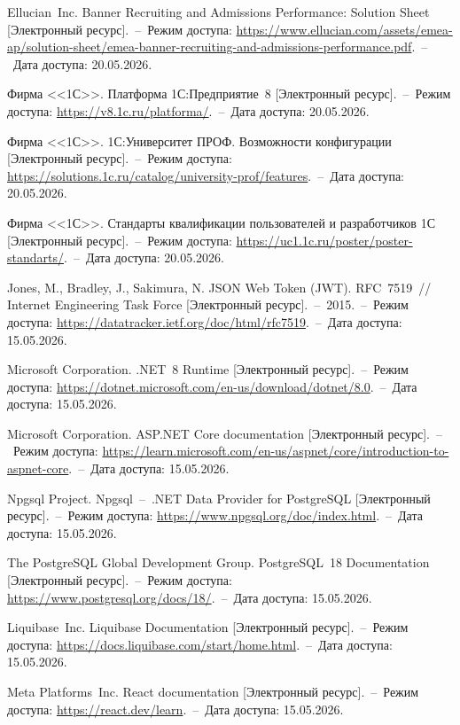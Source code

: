 \begin{enumerate}[label=\arabic*, wide=0pt, labelsep=1ex, nosep]
 Ellucian~Inc. Banner Recruiting and Admissions Performance: Solution Sheet [Электронный ресурс].~--~Режим доступа: \url{https://www.ellucian.com/assets/emea-ap/solution-sheet/emea-banner-recruiting-and-admissions-performance.pdf}.~--~Дата доступа: 20.05.2026.

\src[1c-platform] Фирма <<1С>>. Платформа 1С:Предприятие~8 [Электронный ресурс].~--~Режим доступа: \url{https://v8.1c.ru/platforma/}.~--~Дата доступа: 20.05.2026.

 Фирма <<1С>>. 1С:Университет ПРОФ. Возможности конфигурации [Электронный ресурс].~--~Режим доступа: \url{https://solutions.1c.ru/catalog/university-prof/features}.~--~Дата доступа: 20.05.2026.

\src[1c-standards] Фирма <<1С>>. Стандарты квалификации пользователей и разработчиков 1С [Электронный ресурс].~--~Режим доступа: \url{https://uc1.1c.ru/poster/poster-standarts/}.~--~Дата доступа: 20.05.2026.


\src[jwt] Jones, M., Bradley, J., Sakimura, N. JSON Web Token (JWT). RFC~7519~// Internet Engineering Task Force [Электронный ресурс].~--~2015.~--~Режим доступа: \url{https://datatracker.ietf.org/doc/html/rfc7519}.~--~Дата доступа: 15.05.2026.

\src[dotnet8] Microsoft Corporation. .NET~8 Runtime [Электронный ресурс].~--~Режим доступа: \url{https://dotnet.microsoft.com/en-us/download/dotnet/8.0}.~--~Дата доступа: 15.05.2026.

\src[aspnetcore] Microsoft Corporation. ASP.NET Core documentation [Электронный ресурс].~--~Режим доступа: \url{https://learn.microsoft.com/en-us/aspnet/core/introduction-to-aspnet-core}.~--~Дата доступа: 15.05.2026.

\src[npgsql] Npgsql Project. Npgsql~--~.NET Data Provider for PostgreSQL [Электронный ресурс].~--~Режим доступа: \url{https://www.npgsql.org/doc/index.html}.~--~Дата доступа: 15.05.2026.

\src[postgresql] The PostgreSQL Global Development Group. PostgreSQL~18 Documentation [Электронный ресурс].~--~Режим доступа: \url{https://www.postgresql.org/docs/18/}.~--~Дата доступа: 15.05.2026.

\src[liquibase] Liquibase~Inc. Liquibase Documentation [Электронный ресурс].~--~Режим доступа: \url{https://docs.liquibase.com/start/home.html}.~--~Дата доступа: 15.05.2026.

\src[react] Meta Platforms~Inc. React documentation [Электронный ресурс].~--~Режим доступа: \url{https://react.dev/learn}.~--~Дата доступа: 15.05.2026.


\end{enumerate}

